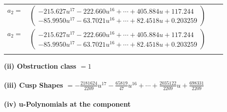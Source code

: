 \documentclass[1p]{elsarticle_modified}
\theoremstyle{definition}
\begin{document}
\begin{tabular}{m{7pt} m{180pt} m{7pt} m{180pt} }
\flushright $a_{2}=$&$\begin{pmatrix}-215.627 u^{17}-222.660 u^{16}+\cdots+405.884 u+117.244\\-85.9950 u^{17}-63.7021 u^{16}+\cdots+82.4518 u+0.203259\end{pmatrix}$\\ \flushright $a_{2}=$&$\begin{pmatrix}-215.627 u^{17}-222.660 u^{16}+\cdots+405.884 u+117.244\\-85.9950 u^{17}-63.7021 u^{16}+\cdots+82.4518 u+0.203259\end{pmatrix}$\\&\end{tabular}
\flushleft \textbf{(ii) Obstruction class $= 1$}\\~\\
\flushleft \textbf{(iii) Cusp Shapes $= -\frac{2181624}{2209} u^{17}-\frac{65819}{47} u^{16}+\cdots+\frac{2035122}{2209} u+\frac{698331}{2209}$}\\~\\
\newpage\renewcommand{\arraystretch}{1}
\flushleft \textbf{(iv) u-Polynomials at the component}\newline \\
\end{document}
